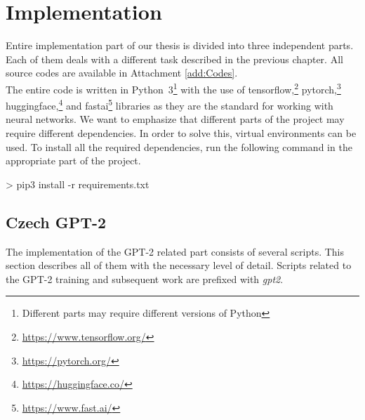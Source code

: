 \chapter{Implementation}
Entire implementation part of our thesis is divided into three independent parts. Each of them deals with a different task described in the previous chapter. All source codes are available in Attachment \ref{add:Codes}.\\

The entire code is written in Python~3\footnote[1]{Different parts may require different versions of Python} with the use of tensorflow,\footnote[2]{\url{https://www.tensorflow.org/}} pytorch,\footnote[3]{\url{https://pytorch.org/}} huggingface,\footnote[4]{\url{https://huggingface.co/}} and fastai\footnote[5]{\url{https://www.fast.ai/}} libraries as they are the standard for working with neural networks. We want to emphasize that different parts of the project may require different dependencies. In order to solve this, virtual environments can be used. To install all the required dependencies, run the following command in the appropriate part of the project.

\begin{code}
> pip3 install -r requirements.txt
\end{code}

\section{Czech GPT-2}
The implementation of the GPT-2 related part consists of several scripts. This section describes all of them with the necessary level of detail. Scripts related to the GPT-2 training and subsequent work are prefixed with \textit{gpt2}.

